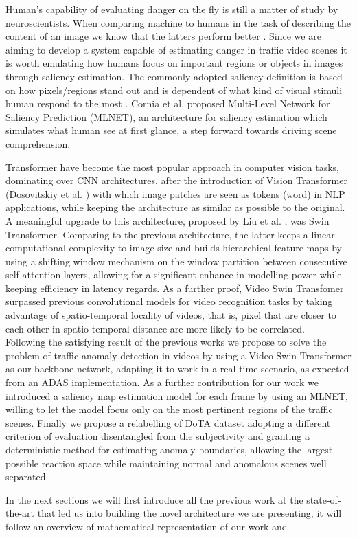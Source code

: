 Human's capability of evaluating danger on the fly is still a matter of study by neuroscientists.
When comparing machine to humans in the task of describing the content of an image we know that the latters perform better \cite{jiang2015salicon}.
Since we are aiming to develop a system capable of estimating danger in traffic video scenes it is worth emulating how humans focus on important regions or objects in images through saliency estimation.
The commonly adopted saliency definition is based on how pixels/regions stand out and is dependent of what kind of visual stimuli human respond to the most \cite{yan2013hierachical}.
Cornia et al.\cite{cornia2016saliency} proposed Multi-Level Network for Saliency Prediction (MLNET), an architecture for saliency estimation which simulates what human see at first glance, a step forward towards driving scene comprehension.

Transformer have become the most popular approach in computer vision tasks, dominating over CNN architectures, after the introduction of Vision Transformer (Dosovitskiy et al. \cite{DBLP:conf/iclr/DosovitskiyB0WZ21})  with which image patches are seen as tokens (word) in NLP applications, while keeping the architecture as similar as possible to the original.
A meaningful upgrade to this architecture, proposed by Liu et al. \cite{liu2021Swin}, was Swin Transformer.
Comparing to the previous architecture, the latter keeps a linear computational complexity to image size and builds hierarchical feature maps by using a shifting window mechanism on the window partition between consecutive self-attention layers, allowing for a significant enhance in modelling power while keeping efficiency in latency regards.
As a further proof, Video Swin Transfomer \cite{liu_video_2022} surpassed previous convolutional models for video recognition tasks by taking advantage of spatio-temporal locality of videos, that is, pixel that are closer to each other in spatio-temporal distance are more likely to be correlated.\\

Following the satisfying result of the previous works we propose to solve the problem of traffic anomaly detection in videos by using a Video Swin Transformer as our backbone network, adapting it to work in a real-time scenario, as expected from an ADAS implementation.
As a further contribution for our work we introduced a saliency map estimation model for each frame by using an MLNET, willing to let the model focus only on the most pertinent regions of the traffic scenes.
Finally we propose a relabelling of DoTA dataset adopting a different criterion of evaluation disentangled from the subjectivity and granting a deterministic method for estimating anomaly boundaries, allowing the largest possible reaction space while maintaining normal and anomalous scenes well separated.

In the next sections we will first introduce all the previous work at the state-of-the-art that led us into building the novel architecture we are presenting, it will follow an overview of mathematical representation of our work and 